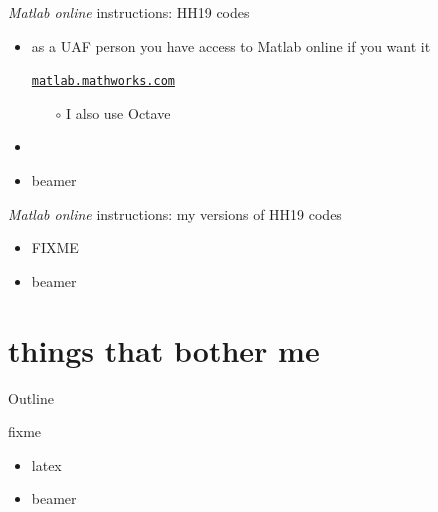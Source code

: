 \documentclass[xcolor={svgnames},
               hyperref={colorlinks,citecolor=DeepPink4,linkcolor=FireBrick,urlcolor=Maroon}]
               {beamer}
\begin{document}
\begin{frame}{\emph{Matlab online} instructions: HH19 codes}

\begin{itemize}
\item as a UAF person you have access to Matlab online if you want it

\begin{center}
\href{https://matlab.mathworks.com/}{\texttt{matlab.mathworks.com}}
\end{center}

    \begin{itemize}
    \item[$\circ$] I also use Octave
    \end{itemize}
\item 
\item beamer
\end{itemize}
\end{frame}


\begin{frame}{\emph{Matlab online} instructions: my versions of HH19 codes}

\begin{itemize}
\item FIXME
\item beamer
\end{itemize}
\end{frame}


\section{things that bother me}

\begin{frame}{Outline}
\end{frame}


\begin{frame}{fixme}

\begin{itemize}
\item latex
\item beamer
\end{itemize}
\end{frame}
\end{document}
